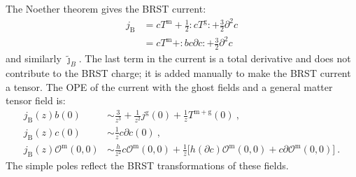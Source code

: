 The Noether theorem gives the BRST current:
\begin{align}
	j_{\mathrm{B}} &=c T^{\mathrm{m}}+\frac{1}{2}: \mathrel{c T^{\mathrm{g}}}:+\frac{3}{2} \partial^{2} c \nonumber \\
	&=c T^{\mathrm{m}}+: \mathrel {b c \partial c}:+\frac{3}{2} \partial^{2} c \label{4.3.3}
\end{align}
and similarly $\tilde{\jmath}_B$. The last term in the current is a total derivative and does not contribute to the BRST charge; it is added manually to make the BRST current a tensor. The OPE of the current with the ghost fields and a general matter tensor field is:
\begin{subequations} \label{4.3.4}
	\begin{align}
		j_{\mathrm{B}}(z) b(0) &\sim \frac{3}{z^{3}}+\frac{1}{z^{2}} j^{\mathrm{g}}(0)+\frac{1}{z} T^{\mathrm{m}+\mathrm{g}}(0)\:, \label{4.3.4a} \\
		j_{\mathrm{B}}(z) c(0) &\sim \frac{1}{z} c \partial c(0) \:, \label{4.3.4b} \\ 
		j_{\mathrm{B}}(z) \mathcal{O}^{\mathrm{m}}(0,0) &\sim \frac{h}{z^{2}} c \mathcal{O}^{\mathrm{m}}(0,0)+\frac{1}{z}\bigl[h(\partial c) \mathcal{O}^{\mathrm{m}}(0,0)+c \partial \mathcal{O}^{\mathrm{m}}(0,0)\bigr] \:. \label{4.3.4c}
	\end{align}
\end{subequations}
The simple poles reflect the BRST transformations of these fields.

